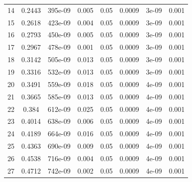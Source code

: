 \documentclass[11pt, a4paper, twocolumn]{article}
\begin{document}
\begin{table}[h]
{\begin{tabular}{cccccccc}
           14 &         0.2443 & 395e-09 &                  0.005 &               0.05 &               0.0009 &         3e-09 &              0.001 \\
           15 &         0.2618 & 423e-09 &                  0.004 &               0.05 &               0.0009 &         3e-09 &              0.001 \\
           16 &         0.2793 & 450e-09  &                  0.005 &               0.05 &               0.0009 &         3e-09 &              0.001 \\
           17 &         0.2967 & 478e-09 &                  0.001 &               0.05 &               0.0009 &         3e-09 &              0.001 \\
           18 &         0.3142 & 505e-09 &                  0.013 &               0.05 &               0.0009 &         3e-09 &              0.001 \\
           19 &         0.3316 & 532e-09 &                  0.013 &               0.05 &               0.0009 &         3e-09 &              0.001 \\
           20 &         0.3491 & 559e-09 &                  0.018 &               0.05 &               0.0009 &         4e-09 &              0.001 \\
           21 &         0.3665 & 585e-09 &                  0.013 &               0.05 &               0.0009 &         4e-09 &              0.001 \\
           22 &         0.384  & 612e-09 &                  0.025 &               0.05 &               0.0009 &         4e-09 &              0.001 \\
           23 &         0.4014 & 638e-09 &                  0.006 &               0.05 &               0.0009 &         4e-09 &              0.001 \\
           24 &         0.4189 & 664e-09 &                  0.016 &               0.05 &               0.0009 &         4e-09 &              0.001 \\
           25 &         0.4363 & 690e-09  &                  0.009 &               0.05 &               0.0009 &         4e-09 &              0.001 \\
           26 &         0.4538 & 716e-09 &                  0.004 &               0.05 &               0.0009 &         4e-09 &              0.001 \\
           27 &         0.4712 & 742e-09 &                  0.002 &               0.05 &               0.0009 &         4e-09 &              0.001 \\

\end{tabular}}
\end{table}
\end{document}
